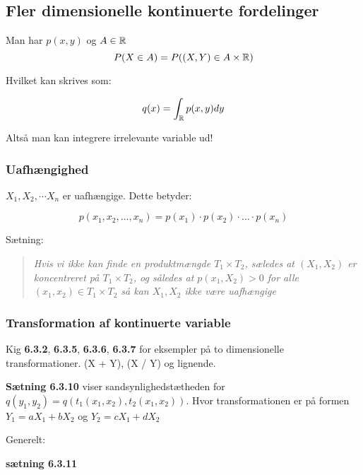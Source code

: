 \subsection{Fler dimensionelle kontinuerte fordelinger}

Man har $p(x,y)$ og $A \in \mathbb{R}$
\begin{equation}
    P(X \in A) = P((X,Y) \in A \times \mathbb{R})
\end{equation}

Hvilket kan skrives som:

\begin{align}
    q(x) = \int_{\mathbb{R}} p(x,y) dy
\end{align}

Altså man kan integrere irrelevante variable ud!

\subsubsection{Uafhængighed}

$X_1, X_2, \cdots X_n$ er uafhængige. Dette betyder:

\begin{equation}
    p(x_1, x_2, \ldots , x_n) = p(x_1) \cdot p(x_2) \cdot \ldots \cdot p(x_n)
\end{equation}

Sætning:

\begin{quote}
    \textit{Hvis vi ikke kan finde en produktmængde $T_1 \times T_2$, sæledes at $(X_1, X_2)$ er koncentreret på $T_1 \times T_2$, og således at $p(x_1, X_2) >0$ for alle $(x_1, x_2) \in T_1 \times T_2$ så kan $X_1, X_2$ ikke være uafhængige}
\end{quote}

\subsubsection{Transformation af kontinuerte variable}

Kig \textbf{6.3.2}, \textbf{6.3.5}, \textbf{6.3.6}, \textbf{6.3.7} for eksempler på to dimensionelle transformationer. (X + Y), (X / Y) og lignende.

\textbf{Sætning 6.3.10} viser sandsynlighedstætheden for $q(y_1, y_2) = q(t_{1}(x_1, x_2), t_2(x_1, x_2))$. Hvor transformationen er på formen $Y_1 = a X_1 + b X_2$ og $Y_2 = c X_1 + d X_2$

Generelt:

\textbf{sætning 6.3.11}

